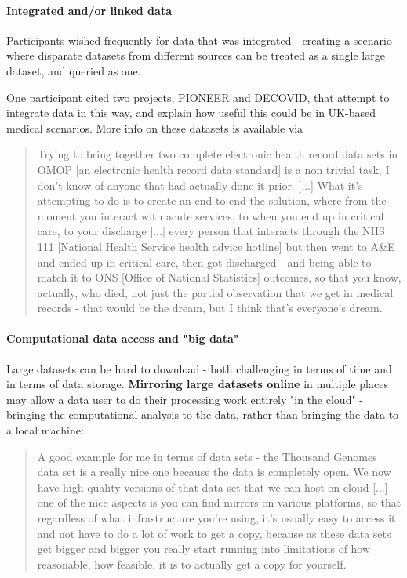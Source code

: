 \documentclass{CUP-JNL-DAP}%
\begin{document}
\paragraph{Integrated and/or linked data}
Participants wished frequently for data that was integrated - creating a scenario where disparate datasets from different sources can be treated as a single large dataset, and queried as one. 

One participant cited two projects, PIONEER and DECOVID, that attempt to integrate data in this way, and explain how useful this could be in UK-based medical scenarios. More info on these datasets is available via \cite{pioneer}

\blockquote{Trying to bring together two complete electronic health record data sets in OMOP [an electronic health record data standard] is a non trivial task, I don't know of anyone that had actually done it prior. [...] What it's attempting to do is to create an end to end the solution, where from the moment you interact with acute services, to when you end up in critical care, to your discharge [...] every person that interacts through the NHS 111 [National Health Service health advice hotline] but then went to A\&E and ended up in critical care, then got discharged - and being able to match it to ONS [Office of National Statistics] outcomes, so that you know, actually, who died, not just the partial observation that we get in medical records - that would be the dream, but I think that's everyone's dream.}

\paragraph{Computational data access and "big data"}
 Large datasets can be hard to download - both challenging in terms of time and in terms of data storage. \textbf{Mirroring large datasets online} in multiple places may allow a data user to do their processing work entirely "in the cloud" - bringing the computational analysis to the data, rather than bringing the data to a local machine: 

\blockquote{A good example for me in terms of data sets - the Thousand Genomes data set is a really nice one because the data is completely open.  We now have high-quality versions of that data set that we can host on cloud [...] one of the nice aspects is you can find mirrors on various platforms, so that regardless of what infrastructure you're using, it's usually easy to access it and not have to do a lot of work to get a copy, because as these data sets get bigger and bigger you really start running into limitations of how reasonable, how feasible, it is to actually get a copy for yourself.}
\end{document}
